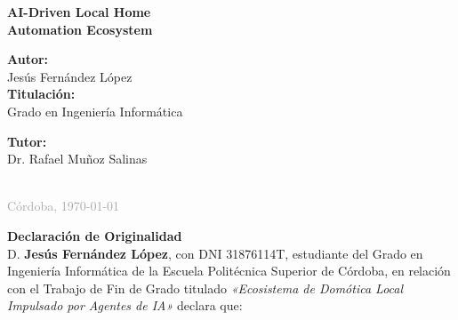 \documentclass[12pt, a4paper, twoside, openright]{report}
\begin{document}
\begin{titlepage}
\begin{center}
        \vspace{0.7cm}
        {\large \textbf{\textcolor{EPSCMedium}{AI-Driven Local Home}}}\\[0.2cm]
        {\large \textbf{\textcolor{EPSCMedium}{Automation Ecosystem}}}
        
        \vfill
        
        \begin{minipage}{0.45\textwidth}
            \begin{flushleft}
                {\large \textbf{Autor:}} \\
                {\Large Jesús Fernández López}\\[0.6cm]
                {\large \textbf{Titulación:}} \\
                {\Large Grado en Ingeniería Informática}
            \end{flushleft}
        \end{minipage}
        \hfill
        \begin{minipage}{0.45\textwidth}
            \begin{flushright}
                {\large \textbf{Tutor:}} \\
                {\Large Dr. Rafael Muñoz Salinas}
            \end{flushright}
        \end{minipage}
        
        \vfill
        
        \makebox[5cm]{\hrulefill}\\[0.5cm]
        
        {\large \textcolor{DarkGray}{Córdoba, \today}}
        \vspace*{1.5cm}
    \end{center}
\end{titlepage}


\newpage
\thispagestyle{empty}
\vspace*{2cm}

{\centering\LARGE\textbf{\textcolor{EPSCDark}{Declaración de Originalidad}}}\\[1.5cm]

D. \textbf{Jesús Fernández López}, con DNI 31876114T, estudiante del Grado en Ingeniería Informática de la Escuela Politécnica Superior de Córdoba, en relación con el Trabajo de Fin de Grado titulado \textit{«Ecosistema de Domótica Local Impulsado por Agentes de IA»} declara que:
\end{document}
